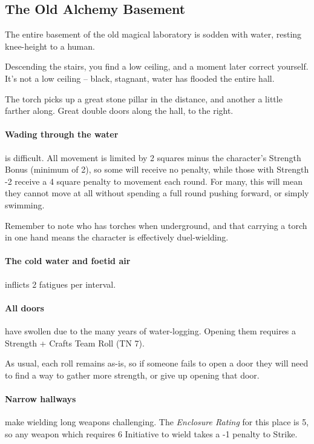 \subsection{The Old Alchemy Basement}
\label{old_alchemy_basement}

The entire basement of the old magical laboratory is sodden with water, resting knee-height to a human.

\begin{boxtext}
  Descending the stairs, you find a low ceiling, and a moment later correct yourself.  It's not a low ceiling -- black, stagnant, water has flooded the entire hall.

  The torch picks up a great stone pillar in the distance, and another a little farther along.
  Great double doors along the hall, to the right.

\end{boxtext}

\paragraph{Wading through the water}
is difficult.
All movement is limited by 2 squares minus the character's Strength Bonus (minimum of 2), so some will receive no penalty, while those with Strength -2 receive a 4 square penalty to movement each round.
For many, this will mean they cannot move at all without spending a full round pushing forward, or simply swimming.

Remember to note who has torches when underground, and that carrying a torch in one hand means the character is effectively duel-wielding.

\paragraph{The cold water and foetid air}
inflicts 2 \glspl{fatigue} per \gls{interval}.

\paragraph{All doors}
have swollen due to the many years of water-logging.
Opening them requires a Strength + Crafts Team Roll (TN 7).

As usual, each roll remains as-is, so if someone fails to open a door they will need to find a way to gather more strength, or give up opening that door.

\paragraph{Narrow hallways}
make wielding long weapons challenging.
The \textit{Enclosure Rating} for this place is 5, so any weapon which requires 6 Initiative to wield takes a -1 penalty to Strike.

